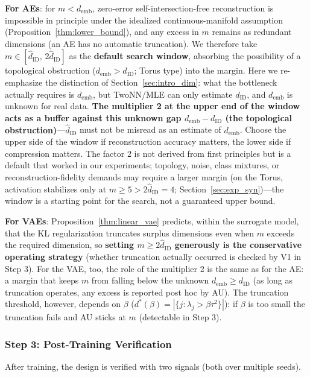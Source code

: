 \documentclass[make,article,submit,pdftex,moreauthors]{Definitions/mdpi}
\newcommand{\dID}{d_{\mathrm{ID}}}
\newcommand{\hatdID}{\hat{d}_{\mathrm{ID}}}
\newcommand{\demb}{d_{\mathrm{emb}}}
\newcommand{\dstar}{d^{*}(\beta)}
\begin{document}
\textbf{For AEs}: for $m < \demb$, zero-error self-intersection-free
reconstruction is impossible in principle under the idealized
continuous-manifold assumption
(Proposition~\ref{thm:lower_bound}), and any excess
in $m$ remains as redundant dimensions (an AE has no automatic truncation).
We therefore take $m \in [\hatdID,\, 2\hatdID]$ as the \textbf{default
search window}, absorbing the possibility of a topological obstruction
($\demb > \dID$; Torus type) into the margin.
Here we re-emphasize the distinction of
Section~\ref{sec:intro_dim}: what the bottleneck actually requires is
$\demb$, but TwoNN/MLE can only estimate $\dID$, and $\demb$ is unknown for
real data.
\textbf{The multiplier 2 at the upper end of the window acts as a buffer
against this unknown gap $\demb - \dID$ (the topological
obstruction)}---$\hatdID$ must not be misread as an estimate of $\demb$.
Choose the upper side of the window if reconstruction accuracy matters, the
lower side if compression matters.
The factor 2 is not derived from first principles but is a default that
worked in our experiments; topology, noise, class mixtures, or
reconstruction-fidelity demands may require a larger margin (on the Torus,
activation stabilizes only at $m \geq 5 > 2\hatdID = 4$;
Section~\ref{sec:exp_syn})---the window is a starting point for the search,
not a guaranteed upper bound.

\textbf{For VAEs}: Proposition~\ref{thm:linear_vae} predicts, within the
surrogate model, that the KL regularization truncates surplus dimensions
even when $m$ exceeds the required dimension, so
\textbf{setting $m \geq 2\hatdID$ generously is the conservative operating
strategy}
(whether truncation actually occurred is checked by V1 in Step 3).
For the VAE, too, the role of the multiplier 2 is the same as for the AE: a
margin that keeps $m$ from falling below the unknown $\demb \geq \dID$ (as
long as truncation operates, any excess is reported post hoc by AU).
The truncation threshold, however, depends on $\beta$
($\dstar = |\{j : \lambda_j > \beta\tau^2\}|$): if $\beta$ is too small the
truncation fails and AU sticks at $m$ (detectable in Step 3).

\subsubsection{Step 3: Post-Training Verification}\label{sec:protocol_s3}

After training, the design is verified with two signals (both over multiple
seeds).
\end{document}
